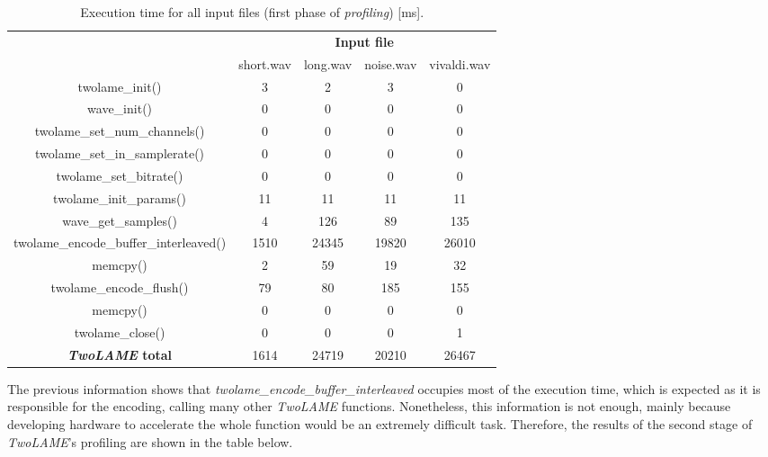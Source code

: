 \begin{table}[H]
    \centering
    \begin{tabular}{c|c|c|c|c|}
    \cline{2-5}
    \multicolumn{1}{c|}{}  & \multicolumn{4}{c|}{\textbf{Input file}} \\
    \cline{2-5}
     & short.wav & long.wav & noise.wav & vivaldi.wav \\
    \hline
    \multicolumn{1}{|c|}{twolame\_init()}  & 3 & 2 & 3 & 0 \\ 
    \hline
    \multicolumn{1}{|c|}{wave\_init()}  & 0 & 0 & 0 & 0 \\ 
    \hline
    \multicolumn{1}{|c|}{twolame\_set\_num\_channels()}   & 0 & 0 & 0 & 0 \\ 
    \hline
    \multicolumn{1}{|c|}{twolame\_set\_in\_samplerate()}   & 0 & 0 & 0 & 0 \\ 
    \hline
    \multicolumn{1}{|c|}{twolame\_set\_bitrate()}   & 0 & 0 & 0 & 0 \\ 
    \hline
    \multicolumn{1}{|c|}{twolame\_init\_params()}   & 11 & 11 & 11 & 11 \\ 
    \hline
    \multicolumn{1}{|c|}{wave\_get\_samples()}   & 4 & 126 & 89 & 135 \\ 
    \hline
    \multicolumn{1}{|c|}{twolame\_encode\_buffer\_interleaved()}   & 1510 & 24345 & 19820 & 26010 \\ 
    \hline
    \multicolumn{1}{|c|}{memcpy()}  & 2 & 59 & 19 & 32 \\ 
    \hline
    \multicolumn{1}{|c|}{twolame\_encode\_flush()}   & 79 & 80 & 185 & 155 \\ 
    \hline
    \multicolumn{1}{|c|}{memcpy()}  & 0 & 0 & 0 & 0 \\ 
    \hline
    \multicolumn{1}{|c|}{twolame\_close()}   & 0 & 0 & 0 & 1 \\ 
    \hline
    \multicolumn{1}{|c|}{\textbf{\textit{TwoLAME} total}}  & 1614 & 24719 & 20210 & 26467 \\ 
    \hline
    \end{tabular}
    \caption{Execution time for all input files (first phase of \textit{profiling}) [ms].}
    \label{profiling1}
\end{table}

The previous information shows that \textit{twolame\_encode\_buffer\_interleaved} occupies most of the execution time, which is expected as it is responsible for the encoding, calling many other \textit{TwoLAME} functions. Nonetheless, this information is not enough, mainly because developing hardware to accelerate the whole function would be an extremely difficult task.
Therefore, the results of the second stage of \textit{TwoLAME}'s profiling are shown in the table below.

